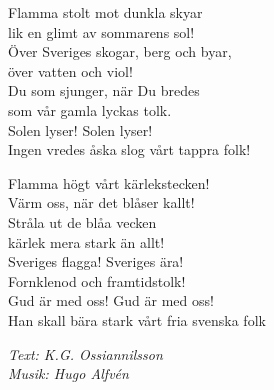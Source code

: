 \vspace{10pt}
Flamma stolt mot dunkla skyar\\
lik en glimt av sommarens sol!\\
Över Sveriges skogar, berg och byar,\\
över vatten och viol!\\
Du som sjunger, när Du bredes\\
som vår gamla lyckas tolk.\\
Solen lyser! Solen lyser!\\
Ingen vredes åska slog vårt tappra folk!\par
\vspace{10pt}
Flamma högt vårt kärlekstecken!\\
Värm oss, när det blåser kallt!\\
Stråla ut de blåa vecken\\
kärlek mera stark än allt!\\
Sveriges flagga! Sveriges ära!\\
Fornklenod och framtidstolk!\\
Gud är med oss! Gud är med oss!\\
Han skall bära stark vårt fria svenska folk\par
\vspace{10pt}
{\footnotesize\textit{Text: K.G. Ossiannilsson\\
Musik: Hugo Alfvén}}
